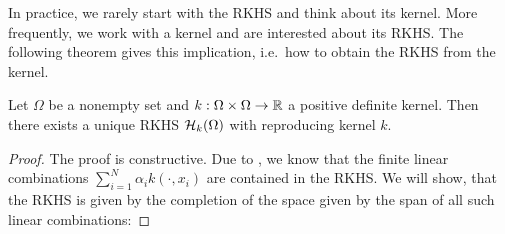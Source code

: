 In practice, we rarely start with the RKHS and think about its kernel. 
More frequently, 
we work with a kernel and are interested about its RKHS.
The following theorem gives this implication, i.e.\ how to obtain the RKHS from the kernel.

\begin{thm}
\label{th:moore_aronszajn}
Let $\Omega$ be a nonempty set and $k: \Omega \times \Omega \rightarrow \mathbb{R}$ a positive definite kernel.
Then there exists a unique RKHS $\mathcal H_k (\Omega)$ with reproducing kernel $k$.
\end{thm}

\begin{proof}
The proof is constructive.
Due to , we know that the finite linear combinations $\sum_{i=1}^N \alpha_i k(\cdot, x_i)$ are contained in the RKHS.
We will show, that the RKHS is given by the completion of the space given by the span of all such linear combinations:


\end{proof}
